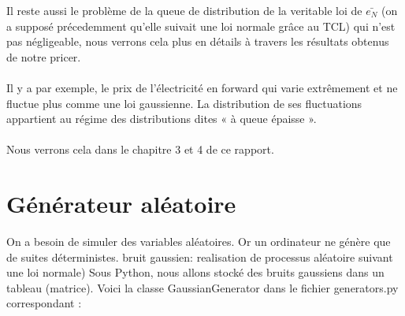 \documentclass[12pt]{report}
\begin{document}
Il reste aussi le problème de la queue de distribution de
la veritable loi de $\bar{e_N}$  (on a supposé précedemment qu'elle suivait une loi normale grâce au TCL) qui n’est pas négligeable, nous verrons cela plus en détails à travers les résultats obtenus de notre pricer.\\\\
Il y a par exemple, le prix de l’électricité en forward
qui varie extrêmement et ne fluctue plus comme une loi
gaussienne. La distribution de ses fluctuations
appartient au régime des distributions dites « à queue
épaisse ».\\\\
Nous verrons cela dans le chapitre 3 et 4 de ce rapport.
\newpage
\section{Générateur aléatoire}
On a besoin de simuler des variables aléatoires. Or un
ordinateur ne génère que de suites déterministes.
bruit gaussien: realisation de processus aléatoire suivant une loi normale)
Sous Python, nous allons stocké des bruits gaussiens dans un tableau (matrice).
Voici la classe GaussianGenerator dans le fichier generators.py correspondant :
\end{document}
